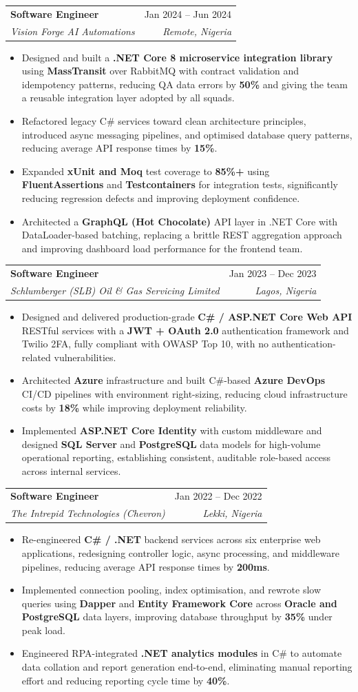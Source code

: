 \documentclass[letterpaper,10pt]{article}
\makeatletter
\newcommand{\resumeItem}[1]{
  \item\small{#1 \vspace{-2pt}}
}
\newcommand{\resumeSubheading}[4]{
  \vspace{-2pt}\item
    \begin{tabular*}{0.99\textwidth}[t]{l@{\extracolsep{\fill}}r}
      \textbf{#1} & #2 \\
      \textit{\small#3} & \textit{\small #4} \\
    \end{tabular*}\vspace{-7pt}
}
\newcommand{\resumeItemListStart}{\begin{itemize}[leftmargin=0.18in]}
\newcommand{\resumeItemListEnd}{\end{itemize}\vspace{-5pt}}
\makeatother
\begin{document}
  \resumeSubheading
    {Software Engineer}{Jan 2024 -- Jun 2024}
    {Vision Forge AI Automations}{Remote, Nigeria}
  \resumeItemListStart
    \resumeItem{Designed and built a \textbf{.NET Core 8 microservice integration library} using \textbf{MassTransit} over RabbitMQ with contract validation and idempotency patterns, reducing QA data errors by \textbf{50\%} and giving the team a reusable integration layer adopted by all squads.}
    \resumeItem{Refactored legacy C\# services toward clean architecture principles, introduced async messaging pipelines, and optimised database query patterns, reducing average API response times by \textbf{15\%}.}
    \resumeItem{Expanded \textbf{xUnit and Moq} test coverage to \textbf{85\%+} using \textbf{FluentAssertions} and \textbf{Testcontainers} for integration tests, significantly reducing regression defects and improving deployment confidence.}
    \resumeItem{Architected a \textbf{GraphQL (Hot Chocolate)} API layer in .NET Core with DataLoader-based batching, replacing a brittle REST aggregation approach and improving dashboard load performance for the frontend team.}
  \resumeItemListEnd

  \resumeSubheading
    {Software Engineer}{Jan 2023 -- Dec 2023}
    {Schlumberger (SLB) Oil \& Gas Servicing Limited}{Lagos, Nigeria}
  \resumeItemListStart
    \resumeItem{Designed and delivered production-grade \textbf{C\# / ASP.NET Core Web API} RESTful services with a \textbf{JWT + OAuth 2.0} authentication framework and Twilio 2FA, fully compliant with OWASP Top 10, with no authentication-related vulnerabilities.}
    \resumeItem{Architected \textbf{Azure} infrastructure and built C\#-based \textbf{Azure DevOps} CI/CD pipelines with environment right-sizing, reducing cloud infrastructure costs by \textbf{18\%} while improving deployment reliability.}
    \resumeItem{Implemented \textbf{ASP.NET Core Identity} with custom middleware and designed \textbf{SQL Server} and \textbf{PostgreSQL} data models for high-volume operational reporting, establishing consistent, auditable role-based access across internal services.}
  \resumeItemListEnd

  \resumeSubheading
    {Software Engineer}{Jan 2022 -- Dec 2022}
    {The Intrepid Technologies (Chevron)}{Lekki, Nigeria}
  \resumeItemListStart
    \resumeItem{Re-engineered \textbf{C\# / .NET} backend services across six enterprise web applications, redesigning controller logic, async processing, and middleware pipelines, reducing average API response times by \textbf{200ms}.}
    \resumeItem{Implemented connection pooling, index optimisation, and rewrote slow queries using \textbf{Dapper} and \textbf{Entity Framework Core} across \textbf{Oracle and PostgreSQL} data layers, improving database throughput by \textbf{35\%} under peak load.}
    \resumeItem{Engineered RPA-integrated \textbf{.NET analytics modules} in C\# to automate data collation and report generation end-to-end, eliminating manual reporting effort and reducing reporting cycle time by \textbf{40\%}.}
  \resumeItemListEnd
\end{document}
